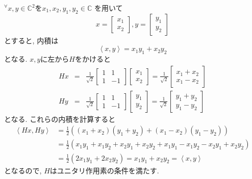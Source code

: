 \documentclass[a4paper,11pt]{jsarticle}
\begin{document}
${}^\forall x, y \in \mathbb{C}^2$を$x_1, x_2, y_1, y_2 \in \mathbb{C}$
を用いて
\[
  x = \begin{bmatrix}
    x_1 \\ x_2
  \end{bmatrix}, 
  y = \begin{bmatrix}
    y_1 \\ y_2
  \end{bmatrix}
\]
とすると, 内積は
\begin{equation*}
  \left<x, y\right> = x_1y_1 + x_2y_2
\end{equation*}
となる. $x, y$に左から$H$をかけると
\begin{eqnarray*}
  Hx &=& \frac{1}{\sqrt{2}} \begin{bmatrix}
    1 & 1 \\ 1 & -1
  \end{bmatrix} \begin{bmatrix}
    x_1 \\ x_2
  \end{bmatrix} = \frac{1}{\sqrt{2}} \begin{bmatrix}
    x_1 + x_2 \\ x_1 - x_2
  \end{bmatrix} \\
  Hy &=& \frac{1}{\sqrt{2}} \begin{bmatrix}
    1 & 1 \\ 1 & -1
  \end{bmatrix} \begin{bmatrix}
    y_1 \\ y_2
  \end{bmatrix} = \frac{1}{\sqrt{2}} \begin{bmatrix}
    y_1 + y_2 \\ y_1 - y_2
  \end{bmatrix}
\end{eqnarray*}
となる. これらの内積を計算すると
\begin{equation*}
  \begin{split}
    \left<Hx, Hy\right> &= \frac{1}{2}\left(
      \left(x_1+x_2\right)\left(y_1+y_2\right) + 
      \left(x_1-x_2\right)\left(y_1-y_2\right)
    \right) \\
    &= \frac{1}{2}\left(
      x_1y_1+x_1y_2+x_2y_1+x_2y_2+
      x_1y_1-x_1y_2-x_2y_1+x_2y_2
    \right) \\
    &= \frac{1}{2}\left(
      2x_1y_1 + 2x_2y_2
    \right) = x_1y_1 + x_2y_2 = \left<x, y\right>
  \end{split}
\end{equation*}
となるので, $H$はユニタリ作用素の条件を満たす.
\end{document}
